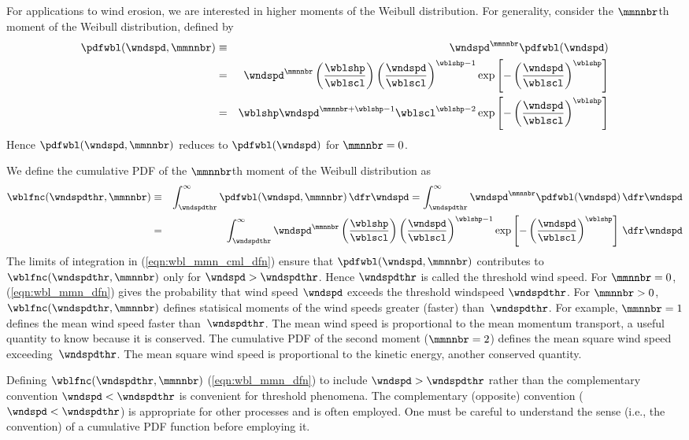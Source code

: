 \documentclass[12pt,twoside]{book}
\begin{document}
For applications to wind erosion, we are interested in higher moments
of the Weibull distribution.
For generality, consider the $\mmnnbr$th moment of the Weibull
distribution, defined by 
\begin{eqnarray}
\pdfwbl(\wndspd,\mmnnbr) & \equiv & \wndspd^{\mmnnbr} \pdfwbl(\wndspd) \\
& = & \wndspd^{\mmnnbr} \left( \frac{\wblshp}{\wblscl} \right)
\left( \frac{\wndspd}{\wblscl } \right)^{\wblshp - 1} 
\exp \left[ - \left( \frac{\wndspd}{\wblscl } \right)^{\wblshp} \right]
\nonumber \\
& = & \wblshp \wndspd^{\mmnnbr+\wblshp-1} \wblscl^{\wblshp - 2} 
\exp \left[ - \left( \frac{\wndspd}{\wblscl } \right)^{\wblshp} \right]
\label{eqn:wbl_mmn_dfn}
\end{eqnarray}
Hence $\pdfwbl(\wndspd,\mmnnbr)$ reduces to $\pdfwbl(\wndspd)$ 
for $\mmnnbr = 0$.

We define the cumulative PDF of the $\mmnnbr$th moment of the Weibull 
distribution as
\begin{eqnarray}
\wblfnc(\wndspdthr,\mmnnbr) & \equiv &
\int_{\wndspdthr}^{\infty} \pdfwbl(\wndspd,\mmnnbr) \,\dfr\wndspd = 
\int_{\wndspdthr}^{\infty} \wndspd^{\mmnnbr} \pdfwbl(\wndspd) \,\dfr\wndspd \\
& = &
\int_{\wndspdthr}^{\infty} 
\wndspd^{\mmnnbr} \left( \frac{\wblshp}{\wblscl} \right)
\left( \frac{\wndspd}{\wblscl } \right)^{\wblshp - 1} 
\exp \left[ - \left( \frac{\wndspd}{\wblscl } \right)^{\wblshp} \right]
\,\dfr\wndspd
\label{eqn:wbl_mmn_cml_dfn}
\end{eqnarray}
The limits of integration in (\ref{eqn:wbl_mmn_cml_dfn}) ensure that 
$\pdfwbl(\wndspd,\mmnnbr)$ contributes to
$\wblfnc(\wndspdthr,\mmnnbr)$ only for $\wndspd > \wndspdthr$.
Hence $\wndspdthr$ is called the threshold wind speed.
For $\mmnnbr = 0$, (\ref{eqn:wbl_mmn_dfn}) gives the probability that 
wind speed $\wndspd$ exceeds the threshold windspeed $\wndspdthr$.
For $\mmnnbr > 0$, $\wblfnc(\wndspdthr,\mmnnbr)$ defines statisical
moments of the wind speeds greater (faster) than~$\wndspdthr$.
For example, $\mmnnbr = 1$ defines the mean wind speed faster
than~$\wndspdthr$.
The mean wind speed is proportional to the mean momentum transport, a
useful quantity to know because it is conserved. 
The cumulative PDF of the second moment ($\mmnnbr = 2$) defines the
mean square wind speed exceeding~$\wndspdthr$.
The mean square wind speed is proportional to the kinetic energy,
another conserved quantity.

Defining $\wblfnc(\wndspdthr,\mmnnbr)$ (\ref{eqn:wbl_mmn_dfn}) to
include $\wndspd > \wndspdthr$ rather than the complementary 
convention $\wndspd < \wndspdthr$ is convenient for threshold
phenomena.   
The complementary (opposite) convention ($\wndspd < \wndspdthr$) is
appropriate for other processes and is often employed.
One must be careful to understand the sense (i.e., the convention) of
a cumulative PDF function before employing it.  
\end{document}

